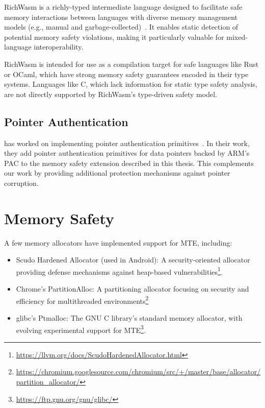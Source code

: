 RichWasm is a richly-typed intermediate language designed to facilitate safe memory interactions between languages with diverse memory management models (e.g., manual and garbage-collected)~\cite{paraskevopoulou2024richwasm}.
It enables static detection of potential memory safety violations, making it particularly valuable for mixed-language interoperability.

RichWasm is intended for use as a compilation target for safe languages like Rust or OCaml, which have strong memory safety guarantees encoded in their type systems.
Languages like C, which lack information for static type safety analysis, are not directly supported by RichWasm's type-driven safety model.

\subsection{Pointer Authentication}
\label{subsec:related-pointer-authentication}

\citeauthor*{rehde2023wasm} has worked on implementing pointer authentication primitives~\cite{rehde2023wasm}.
In their work, they add pointer authentication primitives for data pointers backed by ARM's \ac{PAC} to the memory safety extension described in this thesis.
This complements our work by providing additional protection mechanisms against pointer corruption.

\section{Memory Safety}
\label{sec:related-memory-safety}

A few memory allocators have implemented support for \ac{MTE}, including:

\begin{itemize}
    \item Scudo Hardened Allocator (used in Android): A security-oriented allocator providing defense mechanisms against heap-based vulnerabilities\footnote{\url{https://llvm.org/docs/ScudoHardenedAllocator.html}}.
    \item Chrome's PartitionAlloc: A partitioning allocator focusing on security and efficiency for multithreaded environments\footnote{\url{https://chromium.googlesource.com/chromium/src/+/master/base/allocator/partition\_allocator/}}
    \item glibc's Ptmalloc: The GNU C library's standard memory allocator, with evolving experimental support for \ac{MTE}\footnote{\url{https://ftp.gnu.org/gnu/glibc/}}.
\end{itemize}

